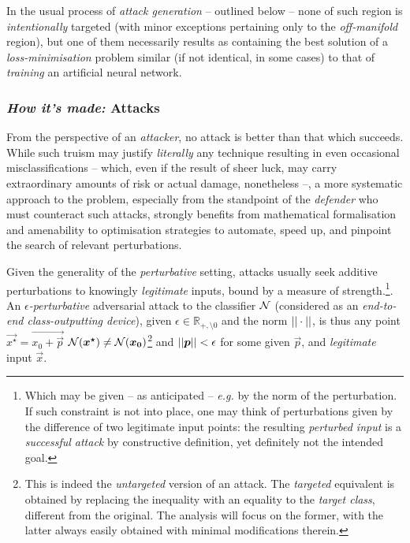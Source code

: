 In the usual process of \textit{attack generation} -- outlined below -- none of such region is \textit{intentionally} targeted (with minor exceptions pertaining only to the \textit{off-manifold} region), but one of them necessarily results as containing the best solution of a \textit{loss-minimisation} problem similar (if not identical, in some cases) to that of \textit{training} an artificial neural network.

\subsubsection{\textit{How it's made:} Attacks}
From the perspective of an \textit{attacker}, no attack is better than that which succeeds. While such truism may justify \textit{literally} any technique resulting in even occasional misclassifications -- which, even if the result of sheer luck, may carry extraordinary amounts of risk or actual damage, nonetheless --, a more systematic approach to the problem, especially from the standpoint of the \textit{defender} who must counteract such attacks, strongly benefits from mathematical formalisation and amenability to optimisation strategies to automate, speed up, and pinpoint the search of relevant perturbations.

Given the generality of the \textit{perturbative} setting, attacks usually seek additive perturbations to knowingly \textit{legitimate} inputs, bound by a measure of strength.\footnote{Which may be given -- as anticipated -- \textit{e.g.} by the norm of the perturbation. If such constraint is not into place, one may think of perturbations given by the difference of two legitimate input points: the resulting \textit{perturbed input} is a \textit{successful attack} by constructive definition, yet definitely not the intended goal.}. An \textit{$\epsilon$-perturbative} adversarial attack to the classifier $\mathcal{N}$ (considered as an \textit{end-to-end class-outputting device}), given $\epsilon \in \mathbb{R}_{+,\setminus0}$ and the norm $||\cdot||$, is thus any point $\vec{x^\star} = \vec{x_{0} + \vec{p}}$ \suchthat $\mathcal{N}(\bm{x^\star}) \neq \mathcal{N}(\bm{x_0})$\footnote{This is indeed the \textit{untargeted} version of an attack. The \textit{targeted} equivalent is obtained by replacing the inequality with an equality to the \textit{target class}, different from the original. The analysis will focus on the former, with the latter always easily obtained with minimal modifications therein.} and $||\bm{p}|| < \epsilon$ for some given $\vec{p}$, and \textit{legitimate} input $\vec{x}$.

